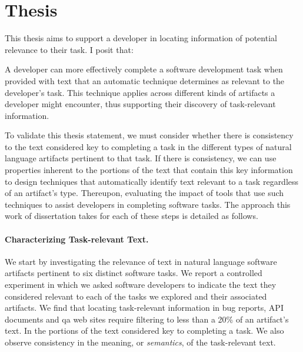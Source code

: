 

\section{Thesis}
\label{cp1:thesis}



This thesis 
aims to support a developer in locating information of potential relevance to their task. I posit that:

\medskip
\begin{bluequote}
    A developer can more effectively complete a software development task when provided
    with text that an automatic technique determines as relevant to the developer's task.
    This technique applies across different kinds
    of artifacts a developer might encounter, thus supporting their discovery of task-relevant information.
\end{bluequote}





To validate this thesis statement, 
we must consider whether there is consistency to 
the text 
considered key to completing a task
in the different types of natural language artifacts pertinent to that task.
If there is consistency, we can use properties inherent 
to the portions of the text that contain this key information 
to design techniques that automatically identify text relevant to a task 
regardless of an artifact's type.
Thereupon, evaluating the impact of tools that use such techniques to assist developers in completing software tasks. 
The approach this work of dissertation takes for each of these steps is detailed as follows.



\paragraph{\textbf{Characterizing Task-relevant Text.}} 


We start by investigating the relevance of text in natural language software artifacts
pertinent to six distinct software tasks.
We report a controlled experiment in which we asked software developers to 
indicate the text they considered relevant to each of the tasks we explored and their associated artifacts.
We find that 
locating task-relevant information in bug
reports, API documents and \acf{qa} web sites require filtering
to less than a 20\% of an artifact's text.
In 
the portions of the text 
considered key to completing a task. We also 
observe consistency in the meaning, or \textit{semantics}, of the
task-relevant text.


